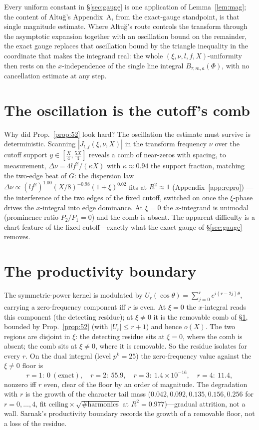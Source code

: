 \documentclass[11pt]{article}
\theoremstyle{definition}
\begin{document}
Every uniform constant in \S\ref{sec:gauge} is one application of Lemma~\ref{lem:mag}; the content of
Altu\u{g}'s Appendix~A, from the exact-gauge standpoint, is that single magnitude estimate. Where
Altu\u{g}'s route controls the transform through the asymptotic expansion together with an oscillation
bound on the remainder, the exact gauge replaces that oscillation bound by the triangle inequality in
the coordinate that makes the integrand real: the whole $(\xi,\nu,l,f,X)$-uniformity then rests on the
$x$-independence of the single line integral $B_{\tau,m,a}(\Phi)$, with no cancellation estimate at any
step.

\section{The oscillation is the cutoff's comb}\label{sec:comb}

Why did Prop.~\ref{prop:52} look hard? The oscillation the estimate must survive is deterministic.
Scanning $|J_{l,f}(\xi,\nu,X)|$ in the transform frequency $\nu$ over the cutoff support
$y\in[\tfrac X4,\tfrac{5X}4]$ reveals a comb of near-zeros with spacing, to measurement,
$\Delta\nu=4lf^2/(\kappa X)$ with $\kappa\approx0.94$ the support fraction, matching the two-edge
beat of $G$: the dispersion law $\Delta\nu\propto(lf^2)^{1.00}(X/8)^{-0.98}(1+\xi)^{0.02}$ fits at
$R^2\approx1$ (Appendix~\ref{app:repro}) --- the interference of the two edges of the fixed cutoff, switched on once
the $\xi$-phase drives the $x$-integral into edge dominance. At $\xi=0$ the $x$-integrand is unimodal
(prominence ratio $P_2/P_1=0$) and the comb is absent. The apparent difficulty is a chart feature of
the fixed cutoff---exactly what the exact gauge of \S\ref{sec:gauge} removes.

\section{The productivity boundary}\label{sec:sarnak}

The symmetric-power kernel is modulated by $U_r(\cos\theta)=\sum_{j=0}^r e^{i(r-2j)\theta}$, carrying
a zero-frequency component iff $r$ is even. At $\xi=0$ the $x$-integral reads this component (the
detecting residue); at $\xi\neq0$ it is the removable comb of \S\ref{sec:comb}, bounded by
Prop.~\ref{prop:52} (with $|U_r|\le r+1$) and hence $o(X)$. The two regions are disjoint in $\xi$:
the detecting residue sits at $\xi=0$, where the comb is absent; the comb sits at $\xi\neq0$, where it
is removable. So the residue isolates for every $r$. On the dual integral (level $p^k=25$) the
zero-frequency value against the $\xi\neq0$ floor is
\[
  r=1:\ 0\ (\text{exact}),\quad r=2:\ 55.9,\quad r=3:\ 1.4\times10^{-16},\quad r=4:\ 11.4,
\]
nonzero iff $r$ even, clear of the floor by an order of magnitude. The degradation with $r$ is the
growth of the character tail mass ($0.042,0.092,0.135,0.156,0.256$ for $r=0,\dots,4$, fit
$\text{ceiling}\times\sqrt{\#\text{harmonics}}$ at $R^2=0.977$)---gradual attrition, not a wall.
Sarnak's productivity boundary \cite[fn.~5]{AltIII} records the growth of a removable floor, not a
loss of the residue.
\end{document}
